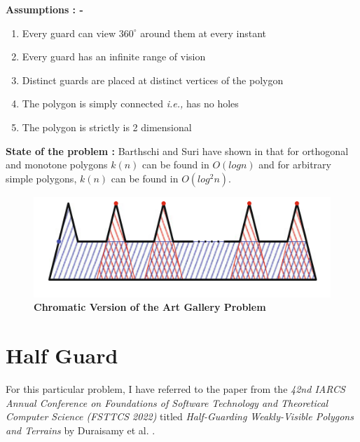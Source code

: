 \documentclass{article}
\begin{document}
\noindent \textbf{Assumptions : -}

\begin{enumerate}

	\item Every guard can view $360 ^ \circ$ around them at every instant
	
	\item Every guard has an infinite range of vision
	
	 \item Distinct guards are placed at distinct vertices of the polygon
	
	\item The polygon is simply connected \textit{i.e.,} has no holes
	
	\item The polygon is strictly is 2 dimensional
	
\end{enumerate}

\noindent \textbf{State of the problem :} Barthschi and Suri have shown in \cite{bartschi2014conflict} that for orthogonal and monotone polygons $k(n)$ can be found in $O(logn)$ and for arbitrary simple polygons, $k(n)$ can be found in $O(log^2n)$.

\begin{figure}[H]
  \includegraphics[scale=0.7]{Chromatic.png}
  \centering
  \caption{\textbf{Chromatic Version of the Art Gallery Problem}}
  \label{img:chromatic}
\end{figure}

\section{Half Guard}

For this particular problem, I have referred to the paper from the \textit{42nd IARCS Annual Conference on Foundations of Software Technology and Theoretical Computer Science (FSTTCS 2022)} titled \textit{Half-Guarding Weakly-Visible Polygons and Terrains} by Duraisamy et al. \cite{duraisamy2022half}. \\
\end{document}
